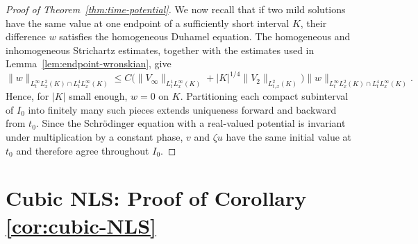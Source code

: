 \documentclass[11pt]{amsart}
\theoremstyle{remark}
\newcommand{\1}{\mathbf 1}
\begin{document}
\begin{proof}[Proof of Theorem~\ref{thm:time-potential}]
We now recall that if two mild solutions have the same value at
one endpoint of a sufficiently short interval $K$, their difference $w$
satisfies the homogeneous Duhamel equation.  The homogeneous and inhomogeneous
Strichartz estimates, together with the estimates used in
Lemma~\ref{lem:endpoint-wronskian}, give
\[
 \|w\|_{L^\infty_tL^2_x(K)\cap L^4_tL^\infty_x(K)}
 \le C\bigl(
 \|V_\infty\|_{L^1_tL^\infty_x(K)}
 +|K|^{1/4}\|V_2\|_{L^2_{t,x}(K)}\bigr)
 \|w\|_{L^\infty_tL^2_x(K)\cap L^4_tL^\infty_x(K)}.
\]
Hence, for $|K|$ small enough, $w=0$ on $K$.
Partitioning each compact subinterval of $I_0$ into finitely many such pieces
extends uniqueness forward and backward from $t_0$.  Since the Schr\"odinger equation with a real-valued potential is invariant under multiplication by a constant phase, $v$ and $\zeta u$ have the same
initial value at $t_0$ and therefore agree throughout $I_0$.
\end{proof}

\section{Cubic NLS: Proof of Corollary \ref{cor:cubic-NLS}}
\end{document}
